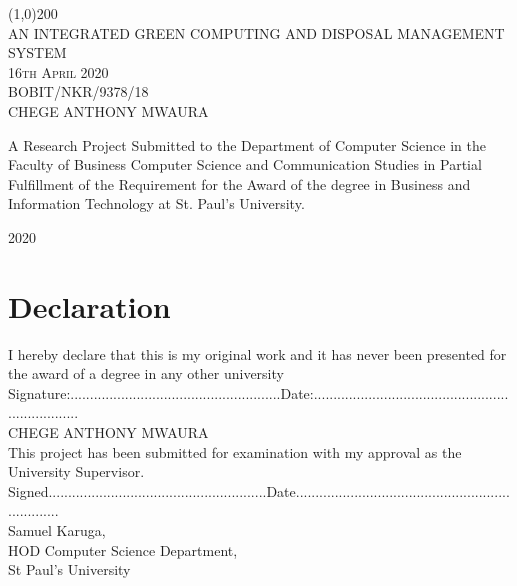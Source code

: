 \documentclass{article}
\begin{document}
\begin{titlepage}
   \begin{center}
   \line(1,0){200}\\
\textsc{\large AN INTEGRATED GREEN COMPUTING AND DISPOSAL MANAGEMENT SYSTEM}\\
[0.75cm]
\textsc{\large  16th April 2020}\\
[0.75cm]
\textsc{\large  BOBIT/NKR/9378/18}\\
[0.75cm]
\textsc{\large CHEGE ANTHONY MWAURA}\\
[0.75cm]

\end{center}
 A Research  Project  Submitted to the Department of Computer Science in the Faculty of Business Computer Science and Communication Studies in Partial Fulfillment of the Requirement for the Award of the degree in Business and Information Technology at St. Paul’s University.
\begin{flushright}
\textsc{\large}
2020\\
\end{flushright}

\end{titlepage}

\section*{Declaration}
I hereby declare that this is my original work and it has never been presented for the award of a degree in any other university\\



Signature:......................................................Date:....................................................................\\

CHEGE ANTHONY MWAURA\\

This project has been submitted for examination with my approval as the University Supervisor.\\


Signed........................................................Date....................................................................\\

Samuel Karuga,\\
HOD Computer Science Department,\\
St Paul’s University\\
\cleardoublepage
\end{document}

